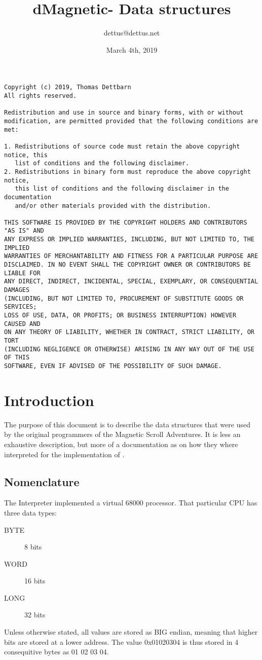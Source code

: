 \documentclass[11pt,twoside,openright]{report}
\begin{document}
\title{dMagnetic- Data structures}
\author{dettus@dettus.net}
\date{March 4th, 2019}
\maketitle
{\tiny
\begin{verbatim}
Copyright (c) 2019, Thomas Dettbarn
All rights reserved.

Redistribution and use in source and binary forms, with or without
modification, are permitted provided that the following conditions are met:

1. Redistributions of source code must retain the above copyright notice, this
   list of conditions and the following disclaimer.
2. Redistributions in binary form must reproduce the above copyright notice,
   this list of conditions and the following disclaimer in the documentation
   and/or other materials provided with the distribution.

THIS SOFTWARE IS PROVIDED BY THE COPYRIGHT HOLDERS AND CONTRIBUTORS "AS IS" AND
ANY EXPRESS OR IMPLIED WARRANTIES, INCLUDING, BUT NOT LIMITED TO, THE IMPLIED
WARRANTIES OF MERCHANTABILITY AND FITNESS FOR A PARTICULAR PURPOSE ARE
DISCLAIMED. IN NO EVENT SHALL THE COPYRIGHT OWNER OR CONTRIBUTORS BE LIABLE FOR
ANY DIRECT, INDIRECT, INCIDENTAL, SPECIAL, EXEMPLARY, OR CONSEQUENTIAL DAMAGES
(INCLUDING, BUT NOT LIMITED TO, PROCUREMENT OF SUBSTITUTE GOODS OR SERVICES;
LOSS OF USE, DATA, OR PROFITS; OR BUSINESS INTERRUPTION) HOWEVER CAUSED AND
ON ANY THEORY OF LIABILITY, WHETHER IN CONTRACT, STRICT LIABILITY, OR TORT
(INCLUDING NEGLIGENCE OR OTHERWISE) ARISING IN ANY WAY OUT OF THE USE OF THIS
SOFTWARE, EVEN IF ADVISED OF THE POSSIBILITY OF SUCH DAMAGE.
\end{verbatim}
}
\tableofcontents
\newpage
\chapter{Introduction}
The purpose of this document is to describe the data structures that were used by the original programmers of the Magnetic Scroll Adventures. It is less an exhaustive description, but more of a documentation as on how they where interpreted for the implementation of \dmagnetic.
\section{Nomenclature}
The Interpreter implemented a virtual 68000 processor. That particular CPU has three data types:
\begin{description}
\item[BYTE]{8 bits}
\item[WORD]{16 bits}
\item[LONG]{32 bits}
\end{description}
Unless otherwise stated, all values are stored as BIG endian, meaning that higher bits are stored at a lower address. The value 0x01020304 is thus stored in 4 consequitive bytes as 01 02 03 04.
\end{document}
